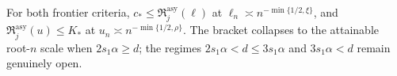For both frontier criteria, \(c_*\le\mathfrak R_j^{\mathrm{asy}}(\ell)\) at \(\ell_n\asymp n^{-\min\{1/2,\xi\}}\), and \(\mathfrak R_j^{\mathrm{asy}}(u)\le K_*\) at \(u_n\asymp n^{-\min\{1/2,\rho\}}\). The bracket collapses to the attainable root-\(n\) scale when \(2s_1\alpha\ge d\); the regimes \(2s_1\alpha<d\le3s_1\alpha\) and \(3s_1\alpha<d\) remain genuinely open.